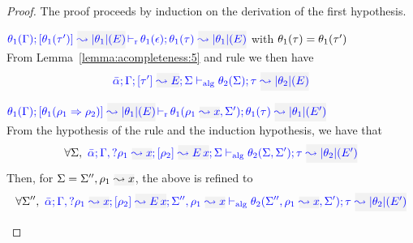 \begin{proof}
The proof proceeds by induction on the derivation of the first hypothesis.
\begin{description}
\setlength{\itemsep}{1em}
\item[\fbox{\rref{M-Simp}}]\quad
$\dmres{\theta_1(\tenv)}{\theta_1(\type')}{\etrans{\theta_1}(E)}{\theta_1(\type)}{\etrans{\theta_1}(E)}{\theta_1(\epsilon)}$ \hfill with $\theta_1(\tau) = \theta_1(\tau')$ \\

From Lemma~\ref{lemma:acompleteness:5} and rule  we then have
\begin{equation*}
  \admres{\bar\alpha}{\tenv}{\type'}{E}{\Sigma}{\type}{\etrans{\theta_2}(E)}{\theta_2(\Sigma)}
\end{equation*}

\item[\fbox{\rref{M-IApp}}]\quad
$\dmres{\theta_1(\tenv)}{\theta_1(\rulet_1\To\rulet_2)}{\etrans{\theta_1}(E)}{\theta_1(\type)}{\etrans{\theta_1}(E')}{\theta_1(\ie{\rulet_1}{x},\Sigma')}$\ \\

  From the hypothesis of the rule and the induction hypothesis, we have that
\begin{equation*}
\forall\Sigma,~\admres{\bar\alpha}{\tenv,\envi{\rulet_1}{x}}{\rulet_2}{\mmapp{E}{x}}{\Sigma}{\type}{\etrans{\theta_2}(E')}{\theta_2(\Sigma,\Sigma')}
\end{equation*}
Then, for $\Sigma = \Sigma'',\ie{\rulet_1}{x}$, the above is refined to
\begin{equation*}
\forall \Sigma'',~\admres{\bar\alpha}{\tenv,\envi{\rulet_1}{x}}{\rulet_2}{\mmapp{E}{x}}{\Sigma'',\ie{\rulet_1}{x}}{\type}{\etrans{\theta_2}(E')}{\theta_2(\Sigma'',\ie{\rulet_1}{x},\Sigma')}
\end{equation*}


\end{description}
\end{proof}
